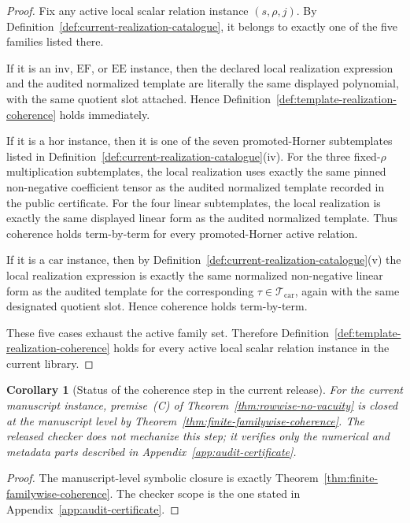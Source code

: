 ﻿\documentclass[11pt]{article}
\newtheorem{corollary}[theorem]{Corollary}
\begin{document}
\begin{proof}
Fix any active local scalar relation instance \((s,\rho,j)\). By
Definition~\ref{def:current-realization-catalogue}, it belongs to exactly one
of the five families listed there.

If it is an \(\mathrm{inv}\), \(\mathrm{EF}\), or \(\mathrm{EE}\) instance,
then the declared local realization expression and the audited normalized
template are literally the same displayed polynomial, with the same quotient
slot attached. Hence Definition~\ref{def:template-realization-coherence} holds
immediately.

If it is a \(\mathrm{hor}\) instance, then it is one of the seven promoted-Horner
subtemplates listed in
Definition~\ref{def:current-realization-catalogue}(iv). For the three
fixed-\(\rho\) multiplication subtemplates, the local realization uses exactly
the same pinned non-negative coefficient tensor as the audited normalized
template recorded in the public certificate. For the four linear subtemplates,
the local realization is exactly the same displayed linear form as the audited
normalized template. Thus coherence holds term-by-term for every promoted-Horner
active relation.

If it is a \(\mathrm{car}\) instance, then by
Definition~\ref{def:current-realization-catalogue}(v) the local realization
expression is exactly the same normalized non-negative linear form as the
audited template for the corresponding \(\tau\in\mathcal T_{\mathrm{car}}\),
again with the same designated quotient slot. Hence coherence holds term-by-term.

These five cases exhaust the active family set. Therefore
Definition~\ref{def:template-realization-coherence} holds for every active local
scalar relation instance in the current library.
\end{proof}

\begin{corollary}[Status of the coherence step in the current release]
\label{cor:coherence-status-current-release}
For the current manuscript instance, premise~\textnormal{(C)} of
Theorem~\ref{thm:rowwise-no-vacuity} is closed at the manuscript level by
Theorem~\ref{thm:finite-familywise-coherence}. The released checker does not
mechanize this step; it verifies only the numerical and metadata parts described
in Appendix~\ref{app:audit-certificate}.
\end{corollary}

\begin{proof}
The manuscript-level symbolic closure is exactly
Theorem~\ref{thm:finite-familywise-coherence}. The checker scope is the one
stated in Appendix~\ref{app:audit-certificate}.
\end{proof}
\end{document}
